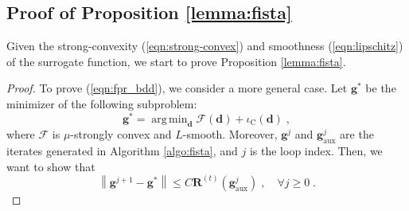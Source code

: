 \documentclass[final]{siamart1116}
\newcommand{\mb}[1]{\mathbf{#1}}
\providecommand{\norm}[1]{\left\lVert#1\right\rVert}
\DeclareMathOperator*{\argmin}{arg\,min}
\def \F  {\mathcal{F}}
\def \fpr {\mathbf{R}}
\begin{document}
\subsection{Proof of Proposition \ref{lemma:fista}}
\label{app:lemma-fista}

Given the strong-convexity (\ref{eqn:strong-convex}) and smoothness (\ref{eqn:lipschitz}) of the surrogate function, we start to prove Proposition \ref{lemma:fista}.
\begin{proof} To prove (\ref{eqn:fpr_bdd}), we consider a more general case. Let $\mb{g}^*$ be the minimizer of the following subproblem:
\[
\mb{g}^* = \argmin_{\mb{d}}\F(\mb{d}) + \iota_{\text{C}}(\mb{d}) \;,
\]
where $\F$ is $\mu$-strongly convex and $L$-smooth. Moreover, $\mb{g}^{j}$ and $\mb{g}_{\text{aux}}^{j}$ are the  iterates generated in Algorithm \ref{algo:fista}, and $j$ is the loop index. Then, we want to show that
\begin{equation}
\label{eqn:fpr_bdd-proof}
\norm{\mb{g}^{j+1}-\mb{g}^*} \leq C \fpr^{(t)}(\mb{g}^{j}_{\text{aux}}) \;, \quad \forall j \geq 0 \;.
\end{equation}


\end{proof}
\end{document}
